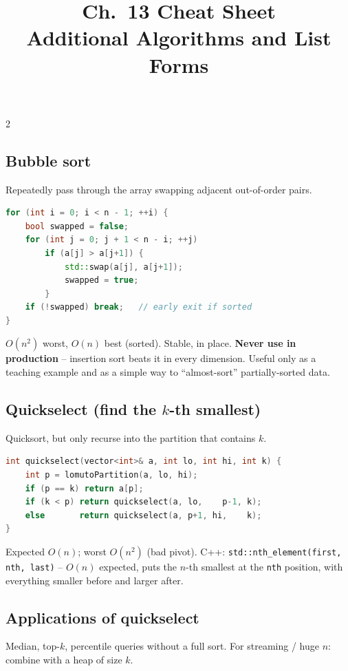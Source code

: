 \documentclass[10pt]{article}
\title{Ch.~13 Cheat Sheet\\\large Additional Algorithms and List Forms}
\author{}
\date{}
\begin{document}
\maketitle
\vspace{-2em}

\begin{multicols}{2}

\subsection*{Bubble sort}
Repeatedly pass through the array swapping adjacent
out-of-order pairs.
\begin{lstlisting}[language=C++]
for (int i = 0; i < n - 1; ++i) {
    bool swapped = false;
    for (int j = 0; j + 1 < n - i; ++j)
        if (a[j] > a[j+1]) {
            std::swap(a[j], a[j+1]);
            swapped = true;
        }
    if (!swapped) break;   // early exit if sorted
}
\end{lstlisting}
$O(n^2)$ worst, $O(n)$ best (sorted). Stable, in place.
\textbf{Never use in production} -- insertion sort beats it in
every dimension. Useful only as a teaching example and as a
simple way to ``almost-sort'' partially-sorted data.

\subsection*{Quickselect (find the $k$-th smallest)}
Quicksort, but only recurse into the partition that contains $k$.
\begin{lstlisting}[language=C++]
int quickselect(vector<int>& a, int lo, int hi, int k) {
    int p = lomutoPartition(a, lo, hi);
    if (p == k) return a[p];
    if (k < p) return quickselect(a, lo,    p-1, k);
    else       return quickselect(a, p+1, hi,    k);
}
\end{lstlisting}
Expected $O(n)$; worst $O(n^2)$ (bad pivot). C++:
\texttt{std::nth\_element(first, nth, last)} -- $O(n)$ expected,
puts the $n$-th smallest at the \texttt{nth} position, with
everything smaller before and larger after.

\subsection*{Applications of quickselect}
Median, top-$k$, percentile queries without a full sort. For
streaming / huge $n$: combine with a heap of size $k$.


\end{multicols}
\end{document}
